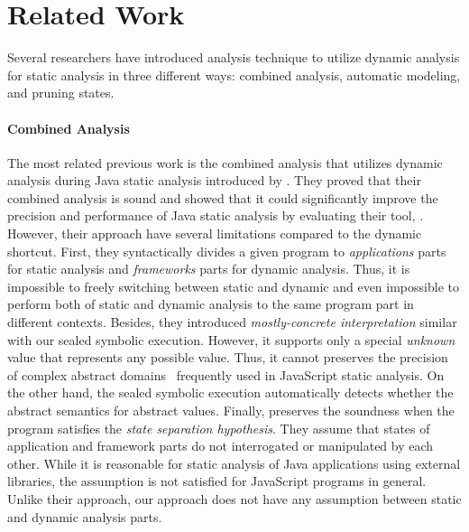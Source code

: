 \section{Related Work}\label{sec:related}

Several researchers have introduced analysis technique to utilize dynamic
analysis for static analysis in three different ways: combined analysis,
automatic modeling, and pruning states.


\paragraph{Combined Analysis}

The most related previous work is the combined analysis that utilizes dynamic
analysis during Java static analysis introduced by \citet{concerto}.  They
proved that their combined analysis is sound and showed that it could
significantly improve the precision and performance of Java static analysis by
evaluating their tool, \concerto.  However, their approach have several
limitations compared to the dynamic shortcut.  First, they syntactically divides
a given program to \textit{applications} parts for static analysis and
\textit{frameworks} parts for dynamic analysis.  Thus, it is impossible to
freely switching between static and dynamic and even impossible to perform both
of static and dynamic analysis to the same program part in different contexts.
Besides, they introduced \textit{mostly-concrete interpretation} similar with
our sealed symbolic execution.  However, it supports only a special
\textit{unknown} value that represents any possible value.  Thus, it cannot
preserves the precision of complex abstract domains~\cite{revisit-recency,
regex, weaklySPE} frequently used in JavaScript static analysis.  On the other
hand, the sealed symbolic execution automatically detects whether the abstract
semantics for abstract values.  Finally, \concerto preserves the soundness when
the program satisfies the \textit{state separation hypothesis}.  They assume
that states of application and framework parts do not interrogated or
manipulated by each other.  While it is reasonable for static analysis of Java
applications using external libraries, the assumption is not satisfied for
JavaScript programs in general.  Unlike their approach, our approach does not
have any assumption between static and dynamic analysis parts.


